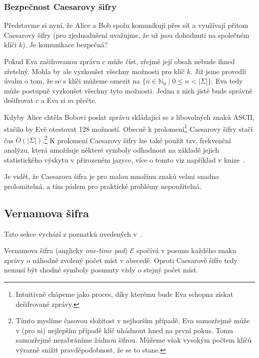 \documentclass[
  program=infoi,
  biblatex=false,
  figures=true,
  glossaries,
  tables=false,
  sourcecodes=true,
  index
]{kidiplom}
\begin{document}
    \subsubsection{Bezpečnost Caesarovy šifry}

        Představme si nyní, že Alice a Bob spolu komunikují přes síť a využívají přitom Caesarovy šifry
        (pro zjednodušení uvažujme, že už jsou dohodnuti na společném klíči $k$).
        Je komunikace bezpečná?

        Pokud Eva zašifrovanou zprávu $c$ může číst, zřejmě její obsah nebude ihned zřetelný. Mohla by ale
        vyzkoušet všechny možnosti pro klíč $k$. Již jsme provedli úvahu o tom, že se s klíči můžeme omezit na
        $\{n \in \mathbb{N}_0 \mid 0 \leq n < |\Sigma|\}$. Eva tedy může postupně vyzkoušet všechny tyto
        možnosti. Jedna z nich jistě bude správně dešifrovat $c$ a Eva si $m$ přečte.

        Kdyby Alice chtěla Bobovi poslat zprávu skládající se z libovolných znaků ASCII, stačilo by
        Evě otestovat 128 možností.
        Obecně k prolomení\footnote{Intuitivně chápeme jako proces, díky kterému bude Eva schopna získat dešifrované zprávy.}
        Caesarovy šifry stačí čas $O(|\Sigma|)$.\footnote{Tímto myslíme časovou složitost v nejhorším případě.
        Eva samozřejmě může v (pro ni) nejlepším případě klíč uhádnout hned na první pokus. Tomu samozřejmě nezabráníme žádnou šifrou.
        Můžeme však vysokým počtem klíčů výrazně snížit pravděpodobnost, že se to stane.}
        K prolomení Caesarovy šifry lze také použít tzv. frekvenční analýzu, která umožňuje některé
        symboly odhadnout na základě jejich statistického výskytu v přirozeném jazyce,
        více o tomto viz například v knize~\cite{theory-and-practice}.

        Je vidět, že Caesarova šifra je pro malou množinu znaků velmi snadno prolomitelná, a tím pádem pro
        praktické problémy nepoužitelná.


\subsection{Vernamova šifra}

    Tato sekce vychází z poznatků uvedených v~\cite{graduate-course}.

    Vernamova šifra (anglicky \emph{one-time pad}) $\mathcal{E}$ spočívá v posunu každého znaku zprávy
    o náhodně zvolený počet míst v abecedě.
    Oproti Caesarově šifře tedy nemusí být shodné symboly posunuty vždy o stejný počet míst.
\end{document}
